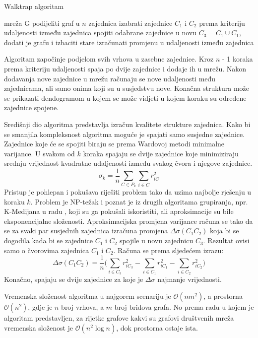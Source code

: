 \begin{algorithm}
	\caption{Walktrap algoritam}
	\begin{algorithmic}[1]
		\REQUIRE mreža G
		\STATE podijeliti graf u $n$ zajednica
			\STATE izabrati zajednice $C_{1}$ i $C_{2}$ prema kriteriju udaljenosti između zajednica
			\STATE spojiti odabrane zajednice u novu $C_{3} = C_{1} \cup C_{1}$, dodati je grafu i izbaciti stare
			\STATE izračunati promjenu u udaljenosti između zajednica
		\ENDFOR		
	\end{algorithmic}
\end{algorithm}

Algoritam započinje podjelom svih vrhova u zasebne zajednice. Kroz $n$  - 1 koraka prema kriteriju udaljenosti spaja po dvije zajednice i dodaje ih u mrežu. Nakon dodavanja nove zajednice u mrežu računaju se nove udaljenosti među zajednicama, ali samo onima koji su u susjedstvu nove. Konačna struktura može se prikazati dendogramom u kojem se može vidjeti u kojem koraku su određene zajednice spojene.

Središnji dio algoritma predstavlja izračun kvalitete strukture zajednica. Kako bi se smanjila kompleksnost algoritma moguće je spajati samo susjedne zajednice. Zajednice koje će se spojiti biraju se prema Wardovoj metodi minimalne varijance. U svakom od $k$ koraka spajaju se dvije zajednice koje minimiziraju srednju vrijednost kvadratne udaljenosti između svakog čvora i njegove zajednice.
\begin{equation}
	\sigma_{k} = \frac{1}{n} \sum_{C \in P_{k}} \sum_{i \in C} r_{iC}^{2}
\end{equation}
Pristup je pohlepan i pokušava riješiti problem tako da uzima najbolje rješenju u koraku $k$. Problem je NP-težak i poznat je iz drugih algoritama grupiranja, npr. K-Medijana u radu \cite{de2003approximation}, koji su ga pokušali iskoristiti, ali aproksimacije su bile eksponencijalne složenosti. Aproksimacijska promjena varijance računa se tako da se za svaki par susjednih zajednica izračuna promjena $ \Delta \sigma (C_{1} C_{2})$ koja bi se dogodila kada bi se zajednice $C_{1}$ i $C_{2}$ spojile u novu zajednicu $C_{3}$. Rezultat ovisi samo o čvorovima zajednica $C_{1}$ i $C_{2}$. Računa se prema sljedećem izrazu:
\begin{equation}
	\Delta \sigma (C_{1} C_{2}) = \frac{1}{n} \bigg( \sum_{i \in C_{3}}r_{iC_{3}}^{2} - \sum_{i \in C_{1}}r_{iC_{1}}^{2} - \sum_{i \in C_{2}}r_{iC_{2}}^{2} \bigg)
\end{equation}
Konačno, spajaju se dvije zajednice za koje je $\Delta \sigma$ najmanje vrijednosti.

Vremenska složenost algoritma u najgorem scenariju je $\mathcal{O}(mn^{2})$, a prostorna $\mathcal{O}(n^{2})$, gdje je $n$ broj vrhova, a $m$ broj bridova grafa. No prema radu \cite{pons2005computing} u kojem je algoritam predstavljen, za rijetke grafove kakvi su grafovi društvenih mreža vremenska složenost je $\mathcal{O}(n^{2} \log n)$, dok prostorna ostaje ista.